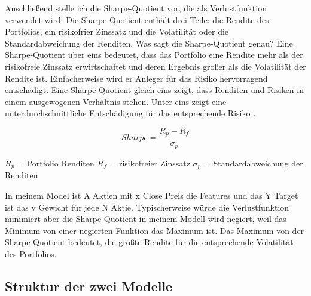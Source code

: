 \documentclass[12pt]{article}
\begin{document}
            Anschließend stelle ich die Sharpe-Quotient vor, die als Verlustfunktion verwendet wird. 
            Die Sharpe-Quotient enthält drei Teile: die Rendite des Portfolios, 
            ein risikofrier Zinssatz und die Volatilität oder die Standardabweichung der Renditen. 
            Was sagt die Sharpe-Quotient genau? Eine Sharpe-Quotient über eins bedeutet, 
            dass das Portfolio eine Rendite mehr als der risikofreie Zinssatz erwirtschaftet und 
            deren Ergebnis großer als die Volatilität der Rendite ist. 
            Einfacherweise wird er Anleger für das Risiko hervorragend entschädigt. 
            Eine Sharpe-Quotient gleich eins zeigt, dass Renditen und Risiken in einem ausgewogenen Verhältnis stehen. 
            Unter eins zeigt eine unterdurchschnittliche Entschädigung für das entsprechende Risiko \cite{sharpe1994}.

            \begin{multicols}{2}
                
                \begin{Large} \[ Sharpe = \frac{R_p - R_f}{\sigma_p} \] \end{Large}

                \vfill

                \begin{small}

                    \noindent $R_p$ = Portfolio Renditen \newline 
                    $R_f$ = risikofreier Zinssatz \newline 
                    $\sigma_p$ = Standardabweichung der Renditen 

                \end{small}

            \end{multicols}

            In meinem Model ist A Aktien mit x Close Preis die Features und das Y Target ist das y Gewicht für jede N Aktie. 
            Typischerweise würde die Verlustfunktion minimiert aber die Sharpe-Quotient in meinem Modell wird negiert, 
            weil das Minimum von einer negierten Funktion das Maximum ist. Das Maximum von der Sharpe-Quotient bedeutet, 
            die größte Rendite für die entsprechende Volatilität des Portfolios.


        \subsection{Struktur der zwei Modelle}
\end{document}
